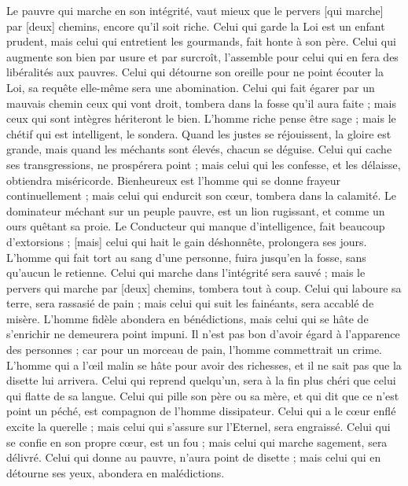 \begin{multicols}{2}
Le pauvre qui marche en son intégrité, vaut mieux que le pervers [qui marche] par [deux] chemins, encore qu'il soit riche.
Celui qui garde la Loi est un enfant prudent, mais celui qui entretient les gourmands, fait honte à son père.
Celui qui augmente son bien par usure et par surcroît, l'assemble pour celui qui en fera des libéralités aux pauvres.
Celui qui détourne son oreille pour ne point écouter la Loi, sa requête elle-même sera une abomination.
Celui qui fait égarer par un mauvais chemin ceux qui vont droit, tombera dans la fosse qu'il aura faite ; mais ceux qui sont intègres hériteront le bien.
L'homme riche pense être sage ; mais le chétif qui est intelligent, le sondera.
Quand les justes se réjouissent, la gloire est grande, mais quand les méchants sont élevés, chacun se déguise.
Celui qui cache ses transgressions, ne prospérera point ; mais celui qui les confesse, et les délaisse, obtiendra miséricorde.
Bienheureux est l'homme qui se donne frayeur continuellement ; mais celui qui endurcit son cœur, tombera dans la calamité.
Le dominateur méchant sur un peuple pauvre, est un lion rugissant, et comme un ours quêtant sa proie.
Le Conducteur qui manque d'intelligence, fait beaucoup d'extorsions ; [mais] celui qui hait le gain déshonnête, prolongera ses jours.
L'homme qui fait tort au sang d'une personne, fuira jusqu'en la fosse, sans qu'aucun le retienne.
Celui qui marche dans l'intégrité sera sauvé ; mais le pervers qui marche par [deux] chemins, tombera tout à coup.
Celui qui laboure sa terre, sera rassasié de pain ; mais celui qui suit les fainéants, sera accablé de misère.
L'homme fidèle abondera en bénédictions, mais celui qui se hâte de s'enrichir ne demeurera point impuni.
Il n'est pas bon d'avoir égard à l'apparence des personnes ; car pour un morceau de pain, l'homme commettrait un crime.
L'homme qui a l'œil malin se hâte pour avoir des richesses, et il ne sait pas que la disette lui arrivera.
Celui qui reprend quelqu'un, sera à la fin plus chéri que celui qui flatte de sa langue.
Celui qui pille son père ou sa mère, et qui dit que ce n'est point un péché, est compagnon de l'homme dissipateur.
Celui qui a le cœur enflé excite la querelle ; mais celui qui s'assure sur l'Eternel, sera engraissé.
Celui qui se confie en son propre cœur, est un fou ; mais celui qui marche sagement, sera délivré.
Celui qui donne au pauvre, n'aura point de disette ; mais celui qui en détourne ses yeux, abondera en malédictions.

\end{multicols}
